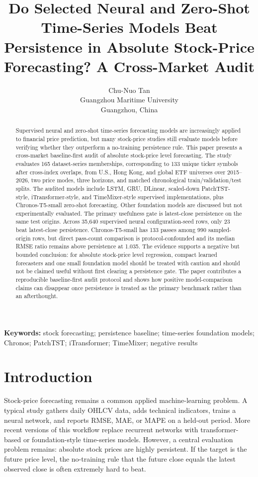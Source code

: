 \documentclass[11pt]{article}
\title{Do Selected Neural and Zero-Shot Time-Series Models Beat Persistence in Absolute Stock-Price Forecasting? A Cross-Market Audit}
\author{Chu-Nuo Tan\\
Guangzhou Maritime University\\
Guangzhou, China}
\date{}
\begin{document}
\maketitle

\begin{abstract}
Supervised neural and zero-shot time-series forecasting models are increasingly applied to financial price prediction, but many stock-price studies still evaluate models before verifying whether they outperform a no-training persistence rule. This paper presents a cross-market baseline-first audit of absolute stock-price level forecasting. The study evaluates 165 dataset-series memberships, corresponding to 133 unique ticker symbols after cross-index overlaps, from U.S., Hong Kong, and global ETF universes over 2015--2026, two price modes, three horizons, and matched chronological train/validation/test splits. The audited models include LSTM, GRU, DLinear, scaled-down PatchTST-style, iTransformer-style, and TimeMixer-style supervised implementations, plus Chronos-T5-small zero-shot forecasting. Other foundation models are discussed but not experimentally evaluated. The primary usefulness gate is latest-close persistence on the same test origins. Across 35,640 supervised neural configuration-seed rows, only 23 beat latest-close persistence. Chronos-T5-small has 133 passes among 990 sampled-origin rows, but direct pass-count comparison is protocol-confounded and its median RMSE ratio remains above persistence at 1.035. The evidence supports a negative but bounded conclusion: for absolute stock-price level regression, compact learned forecasters and one small foundation model should be treated with caution and should not be claimed useful without first clearing a persistence gate. The paper contributes a reproducible baseline-first audit protocol and shows how positive model-comparison claims can disappear once persistence is treated as the primary benchmark rather than an afterthought.
\end{abstract}

\noindent\textbf{Keywords:} stock forecasting; persistence baseline; time-series foundation models; Chronos; PatchTST; iTransformer; TimeMixer; negative results

\section{Introduction}

Stock-price forecasting remains a common applied machine-learning problem. A typical study gathers daily OHLCV data, adds technical indicators, trains a neural network, and reports RMSE, MAE, or MAPE on a held-out period. More recent versions of this workflow replace recurrent networks with transformer-based or foundation-style time-series models. However, a central evaluation problem remains: absolute stock prices are highly persistent. If the target is the future price level, the no-training rule that the future close equals the latest observed close is often extremely hard to beat.
\end{document}
